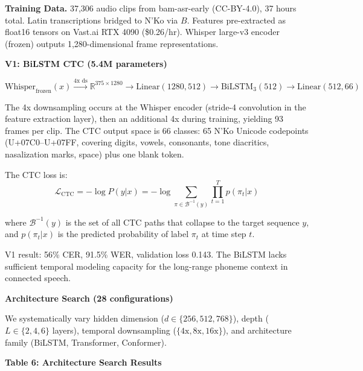 \documentclass[
]{article}
\begin{document}
\textbf{Training Data.} 37,306 audio clips from bam-asr-early
(CC-BY-4.0), 37 hours total. Latin transcriptions bridged to N'Ko via
\(B\). Features pre-extracted as float16 tensors on Vast.ai RTX 4090
(\$0.26/hr). Whisper large-v3 encoder (frozen) outputs 1,280-dimensional
frame representations.

\textbf{V1: BiLSTM CTC (5.4M parameters)}

\[\text{Whisper}_\text{frozen}(x) \xrightarrow{\text{4x ds}} \mathbb{R}^{375 \times 1280} \to \text{Linear}(1280, 512) \to \text{BiLSTM}_3(512) \to \text{Linear}(512, 66)\]

The 4x downsampling occurs at the Whisper encoder (stride-4 convolution
in the feature extraction layer), then an additional 4x during training,
yielding 93 frames per clip. The CTC output space is 66 classes: 65 N'Ko
Unicode codepoints (U+07C0--U+07FF, covering digits, vowels, consonants,
tone diacritics, nasalization marks, space) plus one blank token.

The CTC loss is:
\[\mathcal{L}_\text{CTC} = -\log P(y | x) = -\log \sum_{\pi \in \mathcal{B}^{-1}(y)} \prod_{t=1}^{T} p(\pi_t | x)\]

where \(\mathcal{B}^{-1}(y)\) is the set of all CTC paths that collapse
to the target sequence \(y\), and \(p(\pi_t | x)\) is the predicted
probability of label \(\pi_t\) at time step \(t\).

V1 result: 56\% CER, 91.5\% WER, validation loss 0.143. The BiLSTM lacks
sufficient temporal modeling capacity for the long-range phoneme context
in connected speech.

\textbf{Architecture Search (28 configurations)}

We systematically vary hidden dimension (\(d \in \{256, 512, 768\}\)),
depth (\(L \in \{2, 4, 6\}\) layers), temporal downsampling
(\(\{4\text{x}, 8\text{x}, 16\text{x}\}\)), and architecture family
(BiLSTM, Transformer, Conformer).

\textbf{Table 6: Architecture Search Results}
\end{document}
